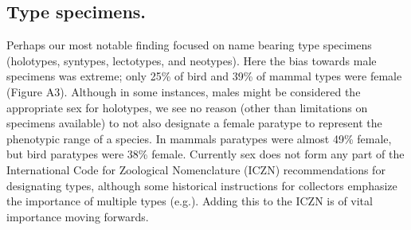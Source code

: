 \documentclass[a4paper, 12pt]{article}
\begin{document}
\subsection{Type specimens.} 
Perhaps our most notable finding focused on name bearing type specimens (holotypes, syntypes, lectotypes, and neotypes). 
Here the bias towards male specimens was extreme; only 25\% of bird and 39\% of mammal types were female (Figure A3). 
Although in some instances, males might be considered the appropriate sex for holotypes, we see no reason (other than limitations on specimens available) to not also designate a female paratype to represent the phenotypic range of a species. 
In mammals paratypes were almost 49\% female, but bird paratypes were 38\% female. 
Currently sex does not form any part of the International Code for Zoological Nomenclature (ICZN) recommendations for designating types, although some historical instructions for collectors emphasize the importance of multiple types (e.g.\cite{schuchert1897type}). 
Adding this to the ICZN is of vital importance moving forwards.
\end{document}
